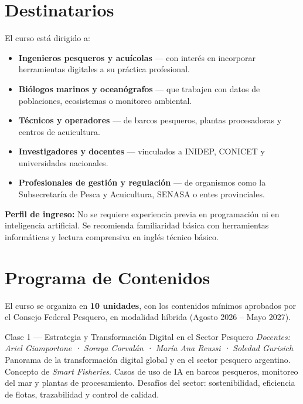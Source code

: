 \documentclass[12pt,a4paper]{article}
\begin{document}
\section{Destinatarios}

El curso está dirigido a:

\begin{itemize}
  \item \textbf{Ingenieros pesqueros y acuícolas} --- con interés en incorporar herramientas digitales a su práctica profesional.
  \item \textbf{Biólogos marinos y oceanógrafos} --- que trabajen con datos de poblaciones, ecosistemas o monitoreo ambiental.
  \item \textbf{Técnicos y operadores} --- de barcos pesqueros, plantas procesadoras y centros de acuicultura.
  \item \textbf{Investigadores y docentes} --- vinculados a INIDEP, CONICET y universidades nacionales.
  \item \textbf{Profesionales de gestión y regulación} --- de organismos como la Subsecretaría de Pesca y Acuicultura, SENASA o entes provinciales.
\end{itemize}

\textbf{Perfil de ingreso:} No se requiere experiencia previa en programación ni en inteligencia artificial. Se recomienda familiaridad básica con herramientas informáticas y lectura comprensiva en inglés técnico básico.

\section{Programa de Contenidos}

El curso se organiza en \textbf{10 unidades}, con los contenidos mínimos aprobados por el Consejo Federal Pesquero, en modalidad híbrida (Agosto 2026 -- Mayo 2027).

\begin{clasebox}{Clase 1 — Estrategia y Transformación Digital en el Sector Pesquero}
  \textit{Docentes: Ariel Giamportone · Soraya Corvalán · María Ana Reussi · Soledad Gurisich}\\[4pt]
  Panorama de la transformación digital global y en el sector pesquero argentino. Concepto de \textit{Smart Fisheries}. Casos de uso de IA en barcos pesqueros, monitoreo del mar y plantas de procesamiento. Desafíos del sector: sostenibilidad, eficiencia de flotas, trazabilidad y control de calidad.
\end{clasebox}
\end{document}
